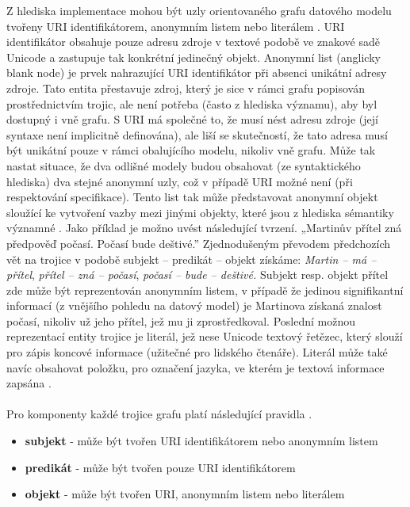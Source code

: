 \documentclass{projekt}
\begin{document}
Z hlediska implementace mohou být uzly orientovaného grafu datového modelu tvořeny URI identifikátorem, anonymním listem nebo literálem \cite{_6}. URI identifikátor obsahuje pouze adresu zdroje v textové podobě ve znakové sadě Unicode a zastupuje tak konkrétní jedinečný objekt. Anonymní list (anglicky blank node) je prvek nahrazující URI identifikátor při absenci unikátní adresy zdroje. Tato entita přestavuje zdroj, který je sice v rámci grafu popisován prostřednictvím trojic, ale není potřeba (často z hlediska významu), aby byl dostupný i vně grafu. S URI má společné to, že musí nést adresu zdroje (její syntaxe není implicitně definována), ale liší se skutečností, že tato adresa musí být unikátní pouze v rámci obalujícího modelu, nikoliv vně grafu. Může tak nastat situace, že dva odlišné modely budou obsahovat (ze syntaktického hlediska) dva stejné anonymní uzly, což v případě URI možné není (při respektování specifikace). Tento list tak může představovat anonymní objekt sloužící ke vytvoření vazby mezi jinými objekty, které jsou z hlediska sémantiky významné \cite{_5}. Jako příklad je možno uvést následující tvrzení. „Martinův přítel zná předpověď počasí. Počasí bude deštivé.” Zjednodušeným převodem předchozích vět na trojice v podobě subjekt – predikát – objekt získáme: {\it Martin – má – přítel}, {\it přítel – zná – počasí},  {\it počasí – bude – deštivé.} 
Subjekt resp. objekt přítel zde může být reprezentován anonymním listem, v případě že jedinou signifikantní informací (z vnějšího pohledu na datový model) je Martinova získaná znalost počasí, nikoliv už jeho přítel, jež mu ji zprostředkoval. 
Poslední možnou reprezentací entity trojice je literál, jež nese Unicode textový řetězec, který slouží pro zápis koncové informace (užitečné pro lidského čtenáře). Literál může také navíc obsahovat položku, pro označení jazyka, ve kterém je textová informace zapsána \cite{_6}. 
\\
\\
Pro komponenty každé trojice grafu platí následující pravidla \cite{_6}.

\begin {itemize}

\item \textbf{subjekt} - může být tvořen URI identifikátorem nebo anonymním listem
\item \textbf{predikát} - může být tvořen pouze URI identifikátorem
\item \textbf{objekt} - může být tvořen URI, anonymním listem nebo literálem

\end{itemize}
\end{document}
